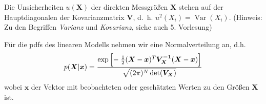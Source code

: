 Die Unsicherheiten $u(\boldsymbol{X})$ der direkten Messgrößen $\boldsymbol{X}$
stehen auf der Hauptdiagonalen der Kovarianzmatrix $\boldsymbol{V}$, d.~h. 
$u^2(X_i) = \operatorname{Var}(X_i)$. (Hinweis: Zu den Begriffen \textsl{Varianz} und 
\textsl{Kovarianz}, siehe auch 5. Vorlesung)

Für die pdfs des linearen Modells nehmen wir eine Normalverteilung 
an, d.h. 
\begin{equation}
p(\boldsymbol{X} | \boldsymbol{x}) = \frac{\textstyle \exp \left[- \; \frac{1}{2} (\boldsymbol{X} - \boldsymbol{x})^T \boldsymbol{V_X^{-1}} (\boldsymbol{X}-\boldsymbol{x}) \right]}{\textstyle \sqrt{(2 \pi)^N \operatorname{det}(\boldsymbol{V_X})}}
\label{eq:pdf_linearModell}
\end{equation}
wobei $\boldsymbol{x}$ der Vektor mit beobachteten oder geschätzten
Werten zu den Größen $\boldsymbol{X}$ ist.

